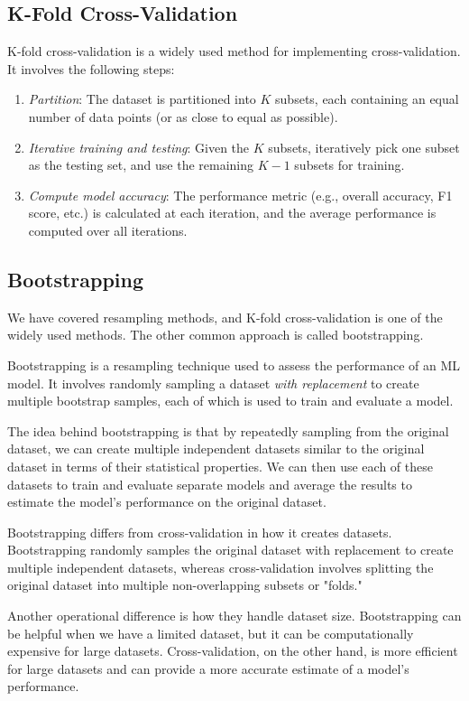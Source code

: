 \documentclass[12pt]{article}
\begin{document}
\subsection{K-Fold Cross-Validation}
K-fold cross-validation is a widely used method for implementing cross-validation. It involves the following steps:
\begin{enumerate}
    \item[\textbf{1)}] \textit{Partition}: The dataset is partitioned into \(K\) subsets, each containing an equal number of data points (or as close to equal as possible).
    \item[\textbf{2)}] \textit{Iterative training and testing}: Given the \(K\) subsets, iteratively pick one subset as the testing set, and use the remaining \(K-1\) subsets for training.
    \item[\textbf{3)}] \textit{Compute model accuracy}: The performance metric (e.g., overall accuracy, F1 score, etc.) is calculated at each iteration, and the average performance is computed over all iterations.
\end{enumerate}

\subsection{Bootstrapping}
We have covered resampling methods, and K-fold cross-validation is one of the widely used methods. The other common approach is called bootstrapping.

Bootstrapping is a resampling technique used to assess the performance of an ML model. It involves randomly sampling a dataset \emph{with replacement} to create multiple bootstrap samples, each of which is used to train and evaluate a model.

The idea behind bootstrapping is that by repeatedly sampling from the original dataset, we can create multiple independent datasets similar to the original dataset in terms of their statistical properties. We can then use each of these datasets to train and evaluate separate models and average the results to estimate the model's performance on the original dataset.

Bootstrapping differs from cross-validation in how it creates datasets. Bootstrapping randomly samples the original dataset with replacement to create multiple independent datasets, whereas cross-validation involves splitting the original dataset into multiple non-overlapping subsets or "folds."

Another operational difference is how they handle dataset size. Bootstrapping can be helpful when we have a limited dataset, but it can be computationally expensive for large datasets. Cross-validation, on the other hand, is more efficient for large datasets and can provide a more accurate estimate of a model's performance.
\end{document}
